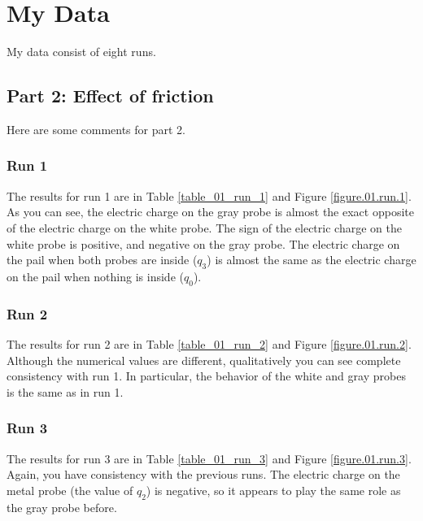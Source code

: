 \section{My Data}
My data consist of eight runs. 
\subsection{Part 2: Effect of friction}
Here are some comments for part 2.
\subsubsection{Run 1}
The results for run 1 are in Table \ref{table_01_run_1} and Figure \ref{figure.01.run.1}. As you can see, the electric charge on the gray probe is almost the exact opposite of the electric charge on the white probe. The sign of the electric charge on the white probe is positive, and negative on the gray probe. The electric charge on the pail when both probes are inside ($q_{3}$) is almost the same as the electric charge on the pail when nothing is inside ($q_{0}$).
\subsubsection{Run 2}
The results for run 2 are in Table \ref{table_01_run_2} and Figure \ref{figure.01.run.2}. Although the numerical values are different, qualitatively you can see complete consistency with run 1. In particular, the behavior of the white and gray probes is the same as in run 1.
\subsubsection{Run 3}
The results for run 3 are in Table \ref{table_01_run_3} and Figure \ref{figure.01.run.3}. Again, you have consistency with the previous runs. The electric charge on the metal probe (the value of $q_{2}$) is negative, so it appears to play the same role as the gray probe before.
